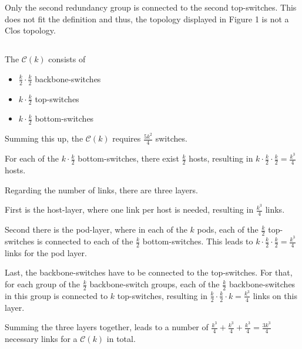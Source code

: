 \documentclass{article}
\begin{document}
    Only the second redundancy group is connected to the second top-switches. This does not fit the definition and thus, the topology displayed in Figure 1 is not a Clos topology.



\subsection{}
The $\mathcal{C}(k)$ consists of
\begin{itemize}
    \item $\frac{k}{2}\cdot \frac{k}{2}$ backbone-switches
    \item $k\cdot \frac{k}{2}$ top-switches
    \item $k\cdot \frac{k}{2}$ bottom-switches
\end{itemize}
Summing this up, the $\mathcal{C}(k)$ requires $\frac{5k^2}{4}$ switches.

\bigskip
For each of the $k\cdot \frac{k}{2}$ bottom-switches, there exist $\frac{k}{2}$ hosts, resulting in $k \cdot \frac{k}{2} \cdot \frac{k}{2} = \frac{k^3}{4}$ hosts.

\bigskip
Regarding the number of links, there are three layers. 

First is the host-layer, where one link per host is needed, resulting in $\frac{k^3}{4}$ links. 

Second there is the pod-layer, where in each of the $k$ pods, each of the $\frac{k}{2}$ top-switches is connected to each of the $\frac{k}{2}$ bottom-switches. This leads to $k \cdot \frac{k}{2} \cdot \frac{k}{2} = \frac{k^3}{4}$ links for the pod layer. 

Last, the backbone-switches have to be connected to the top-switches. For that, for each group of the $\frac{k}{2}$ backbone-switch groups, each of the $\frac{k}{2}$ backbone-switches in this group is connected to $k$ top-switches, resulting in $\frac{k}{2} \cdot \frac{k}{2} \cdot k = \frac{k^3}{4}$ links on this layer.

Summing the three layers together, leads to a number of $\frac{k^3}{4} + \frac{k^3}{4} + \frac{k^3}{4} = \frac{3k^3}{4}$ necessary links for a $\mathcal{C}(k)$ in total.

\subsection{}
\end{document}
